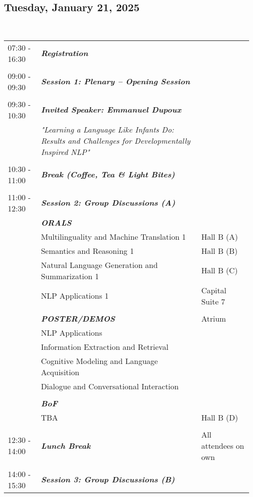 \subsection{Tuesday, January 21, 2025}
\\
\begin{longtable}{p{15mm}p{60mm}p{30mm}}
{07:30 - 16:30} & \emph{\textbf{Registration}} & \\\\
{09:00 - 09:30} & \emph{\textbf{Session 1: Plenary -- Opening Session}} & \\\\
{09:30 - 10:30} & \emph{\textbf{Invited Speaker: Emmanuel Dupoux}} & \\
& \emph{"Learning a Language Like Infants Do: Results and Challenges for Developmentally Inspired NLP"} & \\\\
{10:30 - 11:00} & \emph{\textbf{Break (Coffee, Tea \& Light Bites)}} & \\\\
{11:00 - 12:30} & \emph{\textbf{Session 2: Group Discussions (A)}} & \\
& \emph{\textbf{ORALS}} & \\
& Multilinguality and Machine Translation 1 &  Hall B (A) \\
& Semantics and Reasoning 1 & Hall B (B) \\
& Natural Language Generation and Summarization 1 & Hall B (C) \\
& NLP Applications 1 & Capital Suite 7 \\\\
& \emph{\textbf{POSTER/DEMOS}} & Atrium \\
& NLP Applications & \\
& Information Extraction and Retrieval & \\
& Cognitive Modeling and Language Acquisition & \\
& Dialogue and Conversational Interaction & \\\\
& \emph{\textbf{BoF}} & \\
& TBA & Hall B (D) \\\\
{12:30 - 14:00} & \emph{\textbf{Lunch Break}} & All attendees on own \\\\
{14:00 - 15:30} & \emph{\textbf{Session 3: Group Discussions (B)}} & \\

\end{longtable}
